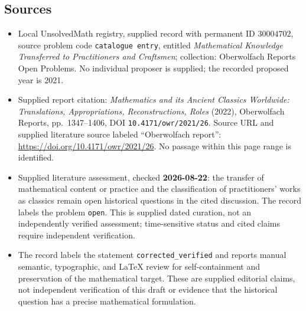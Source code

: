 \documentclass[11pt]{article}
\begin{document}
\subsection{Sources}
\begin{itemize}
\item Local UnsolvedMath registry, supplied record with permanent ID \(30004702\), source problem code \texttt{catalogue entry}, entitled \emph{Mathematical Knowledge Transferred to Practitioners and Craftsmen}; collection: Oberwolfach Reports Open Problems. No individual proposer is supplied; the recorded proposed year is 2021.
\item Supplied report citation: \emph{Mathematics and its Ancient Classics Worldwide: Translations, Appropriations, Reconstructions, Roles} (2022), Oberwolfach Reports, pp.~1347--1406, DOI \texttt{10.4171/owr/2021/26}. Source URL and supplied literature source labeled ``Oberwolfach report'': \url{https://doi.org/10.4171/owr/2021/26}. No passage within this page range is identified.
\item Supplied literature assessment, checked \textbf{2026-08-22}: the transfer of mathematical content or practice and the classification of practitioners' works as classics remain open historical questions in the cited discussion. The record labels the problem \texttt{open}. This is supplied dated curation, not an independently verified assessment; time-sensitive status and cited claims require independent verification.
\item The record labels the statement \texttt{corrected\_verified} and reports manual semantic, typographic, and LaTeX review for self-containment and preservation of the mathematical target. These are supplied editorial claims, not independent verification of this draft or evidence that the historical question has a precise mathematical formulation.
\end{itemize}
\end{document}
